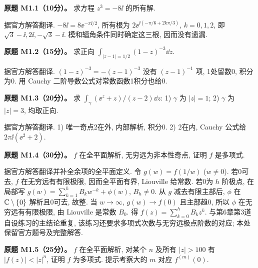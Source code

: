 \begin{exercise}\label{ass:m1-1}
\textbf{原题 M1.1（10分）。} 求方程 $z^3=-8\ii$ 的所有解.
\end{exercise}
\begin{solution}据官方解答翻译. $-8\ii=8\ee^{-\pi\ii/2}$, 所有根为 $2\ee^{\ii(-\pi/6+2k\pi/3)}$, $k=0,1,2$, 即 $\sqrt3-\ii,2\ii,-\sqrt3-\ii$. 模和辐角条件同时确定这三根, 因而没有遗漏.\end{solution}
\begin{exercise}\label{ass:m1-2}
\textbf{原题 M1.2（15分）。} 求正向 $\int_{|z-1|=1/2}(1-z)^{-3}\dd z$.
\end{exercise}
\begin{solution}据官方解答翻译. $(1-z)^{-3}=-(z-1)^{-3}$ 没有 $(z-1)^{-1}$ 项, 1处留数0, 积分为0. 用 Cauchy 二阶导数公式对常数函数1积分也给0.\end{solution}
\begin{exercise}\label{ass:m1-3}
\textbf{原题 M1.3（20分）。} 求 $\int_\gamma(\ee^z+z)/(z-2)\dd z$: 1) $\gamma$ 为 $|z|=1$; 2) $\gamma$ 为 $|z|=3$, 均取正向.
\end{exercise}
\begin{solution}据官方解答翻译. 1) 唯一奇点2在外, 内部解析, 积分0. 2) 2在内, Cauchy 公式给 $2\pi\ii(\ee^2+2)$.\end{solution}
\begin{exercise}\label{ass:m1-4}
\textbf{原题 M1.4（30分）。} $f$ 在全平面解析, 无穷远为非本性奇点, 证明 $f$ 是多项式.
\end{exercise}
\begin{solution}
据官方解答翻译并补全余项的全平面定义. 令 $g(w)=f(1/w)$ ($w\ne0$). 若0可去, $f$ 在无穷远有有限极限, 因而全平面有界, Liouville 给常数. 若0为 $h$ 阶极点, 在局部写 $g(w)=\sum_{k=1}^h B_kw^{-k}+\phi(w)$, $B_h\ne0$. 从 $g$ 减去有限主部后, $\phi$ 在 $\mathbb C\setminus\{0\}$ 解析且0可去, 故整. 当 $w\to\infty$, $g(w)\to f(0)$ 且主部趋0, 所以 $\phi$ 在无穷远有有限极限, 由 Liouville 是常数 $B_0$. 得 $f(z)=\sum_{k=0}^hB_kz^k$. 与第6章第3道自设练习的主结论重复, 该练习还要求多项式次数与无穷远极点阶数的对应; 本处保留官方题号及完整解答.
\end{solution}
\begin{exercise}\label{ass:m1-5}
\textbf{原题 M1.5（25分）。} $f$ 在全平面解析, 对某个 $n$ 及所有 $|z|>100$ 有 $|f(z)|<|z|^n$, 证明 $f$ 为多项式. 提示考察大的 $m$ 对应 $f^{(m)}(0)$.
\end{exercise}
